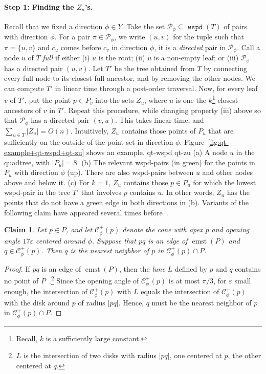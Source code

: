 \documentclass[11pt]{paper}
\newcommand {\eps} {\varepsilon}
\DeclareMathOperator {\wspd}{\texttt{wspd}}
\DeclareMathOperator {\emst}{emst}
\newtheorem {claim}[theorem] {Claim}
\begin{document}
\paragraph{Step 1: Finding the $Z_u$'s.}
Recall that we fixed a direction $\phi \in Y$.  Take the set
$\mathcal{P}_\phi \subseteq \wspd(T)$ of pairs with direction
$\phi$. For a pair $\pi \in \mathcal{P}_{\phi}$, we write 
$(u,v)$ for the tuple such that $\pi = \{u,v\}$ and $c_u$ comes before
$c_v$ in direction $\phi$, it is a \emph{directed} pair in $\mathcal{P}_\phi$. 
Call a node $u$ of $T$ \emph{full} if either 
(i) $u$ is the
root; (ii) $u$ is a non-empty leaf; or (iii) $\mathcal{P_\phi}$ has a
directed pair $(u, v)$. 
Let $T'$ be the tree 
obtained from $T$ by
connecting every full node to its closest full ancestor, and by
removing the other nodes. We can compute $T'$ in linear time
through a post-order traversal.  Now, for every leaf $v$ of $T'$, put
the point $p \in P_v$ into the sets $Z_u$, where $u$ is one the $k$\footnote
{Recall, $k$ is a sufficiently large constant.}
closest ancestors of $v$ in $T'$. Repeat this procedure, while changing
property (iii) above so that $\mathcal{P}_\phi$ has a directed pair
$(v,u)$. 
This takes
linear time, and $\sum_{u \in T} |Z_u| = O(n)$. Intuitively, $Z_u$
contains those points of $P_u$ that are sufficiently on the outside
of the point set in direction $\phi$.
Figure~\ref {fig:qt-example+qt-wspd+qt-zu} shows an example.
 {qt-wspd} {qt-zu}
{(a) A node $u$ in the quadtree, with $|P_u| = 8$.
 (b) The relevant wspd-pairs (in green) for the points in $P_u$
     with direction $\phi$ (up). There are also wspd-pairs between $u$ and
     other nodes above and below it.
 (c) For $k=1$, $Z_u$ contains those $p \in P_u$ for which the 
     lowest wspd-pair in the tree $T'$ that involves $p$ 
     contains $u$.
     In other words, $Z_u$  has the points that do not have a green edge in
     both directions in (b).
}
Variants of the following claim
have appeared several times before~\cite{AgarwalEdScWe91,Yao82}.

\begin{claim}\label{clm:lune_nn}
Let $p \in P$, and let $\mathcal{C}^+_{\phi}(p)$ denote the cone with
apex $p$ and opening angle $17\eps$ centered around $\phi$.
Suppose that $pq$ is an edge of $\emst(P)$ and
$q \in \mathcal{C}^+_{\phi}(p)$.  Then $q$ is the nearest neighbor of $p$
in $\mathcal{C}^+_{\phi}(p) \cap P$.
\end{claim}

\begin{proof}
If $pq$ is an edge of $\emst(P)$, then the \emph{lune} $L$ defined by
$p$ and $q$ contains no point of $P$~\cite{deBergChvKrOv08}.\footnote{$L$
is the intersection
of two disks with radius $|pq|$, one centered at $p$, the other centered
at $q$.}
Since the opening angle of $\mathcal{C}^+_{\phi}(p)$ is at most  $\pi/3$,
for $\eps$ small enough,
the intersection of $\mathcal{C}^+_{\phi}(p)$ with $L$ equals
the intersection of $\mathcal{C}^+_{\phi}(p)$ with the disk around 
$p$ of radius $|pq|$. Hence, $q$ must be the nearest neighbor of
$p$ in $\mathcal{C}^+_{\phi}(p) \cap P$.
\end{proof}
\end{document}

